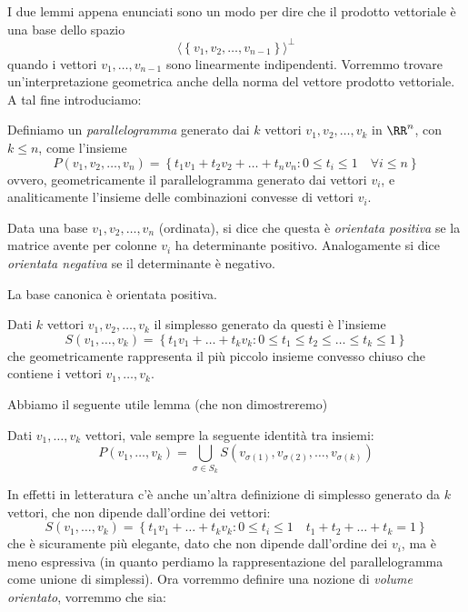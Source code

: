 \documentclass[11pt]{scrartcl}
\begin{document}
   	 I due lemmi appena enunciati sono un modo per dire che il prodotto vettoriale è una base dello spazio 
   	 $$\langle\left\{v_1,v_2,\dots,v_{n-1}\right\}\rangle^\perp$$
   	 quando i vettori $v_1,\dots,v_{n-1}$ sono linearmente indipendenti. Vorremmo trovare un'interpretazione geometrica anche della norma del vettore prodotto vettoriale. A tal fine introduciamo:
   	 \begin{definition}[Parallelogramma]
   	 	Definiamo un \textit{parallelogramma} generato dai $k$ vettori $v_1,v_2,\dots,v_k$ in $\RR^n$, con $k\le n$, come l'insieme
   	 	$$P(v_1,v_2,\dots,v_n)=\left\{t_1v_1+t_2v_2+\dots+t_nv_n: 0\le t_i\le 1 \quad \forall i\le n\right\}$$
   	 	ovvero, geometricamente il parallelogramma generato dai vettori $v_i$, e analiticamente l'insieme delle combinazioni convesse di vettori $v_i$.
   	 \end{definition} 
   	 \begin{definition}
   	 	Data una base $v_1,v_2,\dots,v_n$ (ordinata), si dice che questa è \textit{orientata positiva} se la matrice avente per colonne $v_i$ ha determinante positivo. Analogamente si dice \textit{orientata negativa} se il determinante è negativo.
   	 \end{definition}
   	 \begin{example}
   	 	La base canonica è orientata positiva.
   	 \end{example}
   	 \begin{definition}[Simplesso]
   	 	Dati $k$ vettori $v_1,v_2,\dots,v_k$ il simplesso generato da questi è l'insieme
   	 	$$S(v_1,\dots,v_k)=\left\{t_1v_1+\dots+t_kv_k:0\le t_1\le t_2 \le \dots \le t_k\le 1\right\}$$
   	 	che geometricamente rappresenta il più piccolo insieme convesso chiuso che contiene i vettori $v_1,\dots,v_k$.
   	 \end{definition}
   	 Abbiamo il seguente utile lemma (che non dimostreremo)
   	 \begin{lemma}
   	 	Dati $v_1,\dots, v_k$ vettori, vale sempre la seguente identità tra insiemi:
   	 	$$P(v_1,\dots,v_k)=\bigcup_{\sigma\in S_k}S(v_{\sigma(1)},v_{\sigma(2)},\dots,v_{\sigma(k)})$$
   	 \end{lemma}
   	 In effetti in letteratura c'è anche un'altra definizione di simplesso generato da $k$ vettori, che non dipende dall'ordine dei vettori:
   	 $$S(v_1,\dots,v_k)=\left\{t_1v_1+\dots+t_kv_k:0\le t_i \le 1 \quad t_1+t_2+\dots +t_k=1\right\}$$
   	 che è sicuramente più elegante, dato che non dipende dall'ordine dei $v_i$, ma è meno espressiva (in quanto perdiamo la rappresentazione del parallelogramma come unione di simplessi). Ora vorremmo definire una nozione di \textit{volume orientato}, vorremmo che sia:
\end{document}
